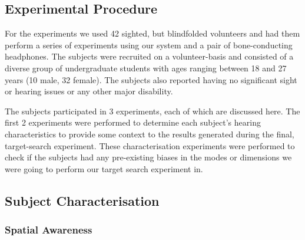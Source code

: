 \documentclass[format=sigconf, review=true, screen=true, anonymous=true]{acmart}
\begin{document}



\subsection{Experimental Procedure}

For the experiments we used 42 sighted, but blindfolded volunteers and had them perform a series of experiments using our system and a pair of bone-conducting headphones. The subjects were recruited on a volunteer-basis and consisted of a diverse group of undergraduate students with ages ranging between 18 and 27 years (10 male, 32 female). The subjects also reported having no significant sight or hearing issues or any other major disability. 

The subjects participated in 3 experiments, each of which are discussed here. The first 2 experiments were performed to determine each subject's hearing characteristics to provide some context to the results generated during the final, target-search experiment. These characterisation experiments were performed to check if the subjects had any pre-existing biases in the modes or dimensions we were going to perform our target search experiment in. 

\subsection{Subject Characterisation}

\subsubsection{Spatial Awareness}
\end{document}
